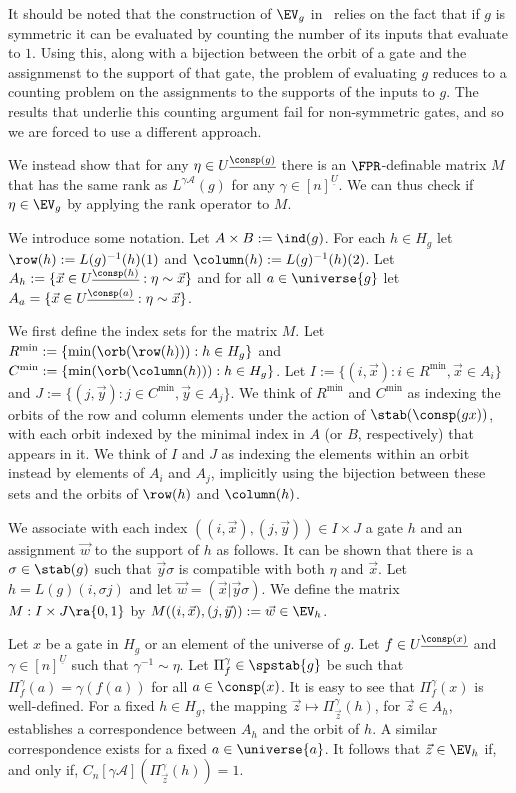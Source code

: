 \documentclass[a4paper,UKenglish]{lipics-v2018}
\begin{document}
It should be noted that the construction of $\EV_g$
in~\cite{AndersonD17} relies on
the fact that if $g$ is symmetric  it can be evaluated by counting the
number of its inputs that evaluate to $1$. Using this, along with a
bijection between the orbit of a gate and the assignmenst to the
support of that gate, the problem of evaluating $g$ reduces to a counting problem on the
assignments to the supports of the inputs to $g$. The results that underlie this
counting argument fail for non-symmetric gates, and so we are forced to use a
different approach.

We instead show that for any $\eta \in U^{\underline{\consp(g)}}$ there is an
$\FPR$-definable matrix $M$ that has the same rank as $L^{\gamma
  \mathcal{A}}(g)$ for any $\gamma \in [n]^{\underline{U}}$. We can thus check
if $\eta \in \EV_g$ by applying the rank operator to $M$.

We introduce some notation. Let $A \times B := \ind(g)$. For each $h \in H_g$
let $\row(h) := L(g)^{-1}(h)(1)$ and $\column(h) := L(g)^{-1}(h)(2)$. Let $A_h
:= \{ \vec{x} \in U^{\underline{\consp(h)}} : \eta \sim \vec{x} \}$ and for all
$a \in \universe{g}$ let $A_a = \{\vec{x} \in U^{\underline{\consp(a)}} : \eta
\sim \vec{x}\}$.

We first define the index sets for the matrix $M$. Let $R^{\min} := \{\min
(\orb(\row(h))) : h \in H_g\}$ and $C^{\min} := \{ \min (\orb (\column(h))) : h
\in H_g\}$. Let $I := \{(i, \vec{x}): i \in R^{\min}, \vec{x} \in A_i\}$ and $J
:= \{(j, \vec{y}): j \in C^{\min}, \vec{y} \in A_j\}$. We think of $R^{\min}$
and $C^{\min}$ as indexing the orbits of the row and column elements under the
action of $\stab(\consp(gx))$, with each orbit indexed by the minimal index in
$A$ (or $B$, respectively) that appears in it. We think of $I$ and $J$ as
indexing the elements within an orbit instead by elements of $A_i$ and $A_j$,
implicitly using the bijection between these sets and the orbits of $\row(h)$
and $\column(h)$.

We associate with each index $((i, \vec{x}), (j, \vec{y})) \in I \times J$ a
gate $h$ and an assignment $\vec{w}$ to the support of $h$ as follows. It can be
shown that there is a $\sigma \in \stab(g)$ such that $\vec{y} \sigma$ is
compatible with both $\eta$ and $\vec{x}$. Let $h = L(g)(i, \sigma j)$ and let
$\vec{w} = (\vec{x} \vert \vec{y} \sigma)$. We define the matrix $M : I \times J
\ra \{0,1\}$ by $M((i , \vec{x}), (j, \vec{y})) := \vec{w} \in \EV_h$.

Let $x$ be a gate in $H_g$ or an element of the universe of $g$. Let $f \in
U^{\underline{\consp(x)}}$ and $\gamma \in [n]^{\underline{U}}$ such that
$\gamma^{-1} \sim \eta$. Let $\Pi^{\gamma}_{f} \in \spstab{g}$ be such that
$\Pi^{\gamma}_f (a) = \gamma (f(a))$ for all $a \in \consp(x)$. It is easy to
see that $\Pi^{\gamma}_f(x)$ is well-defined. For a fixed $h \in H_g$, the
mapping $\vec{z} \mapsto \Pi^{\gamma}_{\vec{z}}(h)$, for $\vec{z} \in A_h$,
establishes a correspondence between $A_h$ and the orbit of $h$. A similar
correspondence exists for a fixed $a \in \universe{a}$. It follows that $\vec{z}
\in \EV_h$ if, and only if, $C_n[\gamma \mathcal{A}](\Pi^{\gamma}_{\vec{z}}(h))
= 1$. \cite{DW-arxiv}
\end{document}
